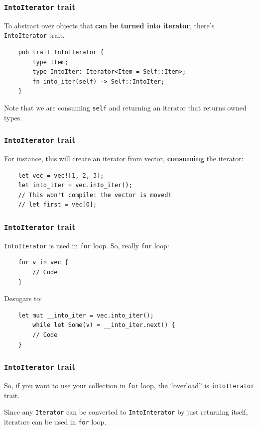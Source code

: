 \documentclass[aspectratio=1610,t]{beamer}
\begin{document}

\begin{frame}[fragile]
\frametitle{\texttt{IntoIterator} trait}
To abstract over objects that \textbf{can be turned into iterator}, there's \texttt{IntoIterator} trait.

\begin{verbatim}
    pub trait IntoIterator {
        type Item;
        type IntoIter: Iterator<Item = Self::Item>;
        fn into_iter(self) -> Self::IntoIter;
    }
\end{verbatim}

Note that we are consuming \texttt{self} and returning an iterator that returns owned types.
\end{frame}


\begin{frame}[fragile]
\frametitle{\texttt{IntoIterator} trait}
For instance, this will create an iterator from vector, \textbf{consuming} the iterator:

\begin{verbatim}
    let vec = vec![1, 2, 3];
    let into_iter = vec.into_iter();
    // This won't compile: the vector is moved!
    // let first = vec[0];
\end{verbatim}
\end{frame}


\begin{frame}[fragile]
\frametitle{\texttt{IntoIterator} trait}
\texttt{IntoIterator} is used in \texttt{for} loop. So, really \texttt{for} loop:

\begin{verbatim}
    for v in vec {
        // Code
    }
\end{verbatim}

Desugars to:

\begin{verbatim}
    let mut __into_iter = vec.into_iter();
        while let Some(v) = __into_iter.next() {
        // Code
    }
\end{verbatim}
\end{frame}


\begin{frame}[fragile]
\frametitle{\texttt{IntoIterator} trait}
So, if you want to use your collection in \texttt{for} loop, the ``overload'' is \texttt{intoIterator} trait.

Since any \texttt{Iterator} can be converted to \texttt{IntoInterator} by just returning itself, iterators can be used in \texttt{for} loop.
\end{frame}
\end{document}

